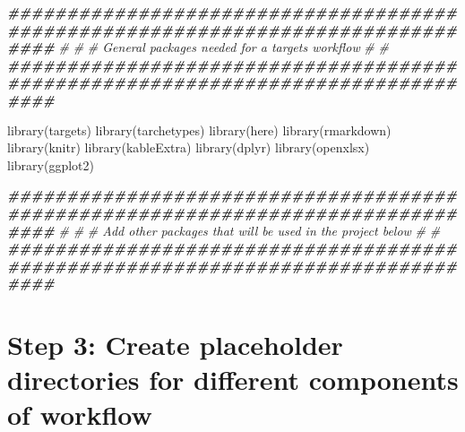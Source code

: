 \documentclass[
  12pt,
]{book}
\newenvironment{Shaded}{\begin{snugshade}}{\end{snugshade}}
\newcommand{\CommentTok}[1]{\textcolor[rgb]{0.56,0.35,0.01}{\textit{#1}}}
\newcommand{\DocumentationTok}[1]{\textcolor[rgb]{0.56,0.35,0.01}{\textbf{\textit{#1}}}}
\newcommand{\FunctionTok}[1]{\textcolor[rgb]{0.00,0.00,0.00}{#1}}
\newcommand{\NormalTok}[1]{#1}
\begin{document}
\begin{Shaded}
\begin{Highlighting}[]
\DocumentationTok{\#\#\#\#\#\#\#\#\#\#\#\#\#\#\#\#\#\#\#\#\#\#\#\#\#\#\#\#\#\#\#\#\#\#\#\#\#\#\#\#\#\#\#\#\#\#\#\#\#\#\#\#\#\#\#\#\#\#\#\#\#\#\#\#\#\#\#\#\#\#\#\#\#\#\#\#\#\#\#\#}
\CommentTok{\#}
\CommentTok{\#\textquotesingle{}}
\CommentTok{\#\textquotesingle{} General packages needed for a targets workflow}
\CommentTok{\#\textquotesingle{}}
\CommentTok{\#}
\DocumentationTok{\#\#\#\#\#\#\#\#\#\#\#\#\#\#\#\#\#\#\#\#\#\#\#\#\#\#\#\#\#\#\#\#\#\#\#\#\#\#\#\#\#\#\#\#\#\#\#\#\#\#\#\#\#\#\#\#\#\#\#\#\#\#\#\#\#\#\#\#\#\#\#\#\#\#\#\#\#\#\#\#}

\FunctionTok{library}\NormalTok{(targets)}
\FunctionTok{library}\NormalTok{(tarchetypes)}
\FunctionTok{library}\NormalTok{(here)}
\FunctionTok{library}\NormalTok{(rmarkdown)}
\FunctionTok{library}\NormalTok{(knitr)}
\FunctionTok{library}\NormalTok{(kableExtra)}
\FunctionTok{library}\NormalTok{(dplyr)}
\FunctionTok{library}\NormalTok{(openxlsx)}
\FunctionTok{library}\NormalTok{(ggplot2)}


\DocumentationTok{\#\#\#\#\#\#\#\#\#\#\#\#\#\#\#\#\#\#\#\#\#\#\#\#\#\#\#\#\#\#\#\#\#\#\#\#\#\#\#\#\#\#\#\#\#\#\#\#\#\#\#\#\#\#\#\#\#\#\#\#\#\#\#\#\#\#\#\#\#\#\#\#\#\#\#\#\#\#\#\#}
\CommentTok{\#}
\CommentTok{\#\textquotesingle{}}
\CommentTok{\#\textquotesingle{} Add other packages that will be used in the project below}
\CommentTok{\#\textquotesingle{}}
\CommentTok{\#}
\DocumentationTok{\#\#\#\#\#\#\#\#\#\#\#\#\#\#\#\#\#\#\#\#\#\#\#\#\#\#\#\#\#\#\#\#\#\#\#\#\#\#\#\#\#\#\#\#\#\#\#\#\#\#\#\#\#\#\#\#\#\#\#\#\#\#\#\#\#\#\#\#\#\#\#\#\#\#\#\#\#\#\#\#}


\end{Highlighting}
\end{Shaded}

\hypertarget{step-3-create-placeholder-directories-for-different-components-of-workflow}{%
\section{Step 3: Create placeholder directories for different components of workflow}\label{step-3-create-placeholder-directories-for-different-components-of-workflow}}
\end{document}
